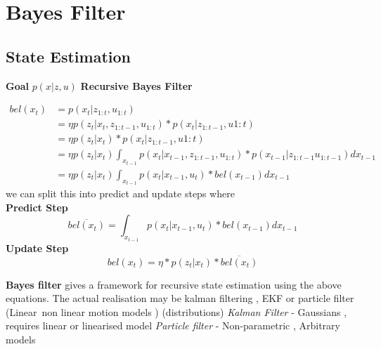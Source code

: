 \documentclass{article}
\begin{document}
\section{Bayes Filter}
\subsection{State Estimation}
    \textbf{Goal} $p(x|z,u)$
    \newline
    \textbf{Recursive Bayes Filter} 

\begin{align*}  
    bel(x_t) & = p(x_t | z_{1:t},u_{1:t})\\
    & = \eta p(z_t|x_t,z_{1:t-1},u_{1:t}) * p(x_t | z_{1:t-1},u{1:t})\\
    & = \eta p(z_t|x_t) * p(x_t | z_{1:t-1},u{1:t})\\
    & = \eta p(z_t|x_t) \int_{x_{t-1}} p(x_t |x_{t-1}, z_{1:t-1},u_{1:t}) * p(x_{t-1}|z_{1:t-1}u_{1:t-1})dx_{t-1}\\
    & = \eta p(z_t|x_t) \int_{x_{t-1}} p(x_t |x_{t-1},u_t) * bel(x_{t-1})dx_{t-1}
 \end{align*}
 we can split this into predict and update steps where\\
 \textbf{Predict Step} 
 $$\overline{bel(x_t)} =  \int_{x_{t-1}} p(x_t |x_{t-1},u_t) * bel(x_{t-1})dx_{t-1}$$
 \textbf{Update Step} 
 $$bel(x_t) =  \eta * p(z_t | x_t) * \overline{bel(x_t)}$$


 \textbf{Bayes filter} gives a framework for recursive state estimation using
 the above equations. The actual realisation  may be kalman filtering , EKF or
 particle filter
 (Linear\ non linear motion models )
 (distributions)
 \textit{Kalman Filter} -  Gaussians , requires linear or linearised model 
 \textit{Particle filter} - Non-parametric , Arbitrary models
 
\end{document}
